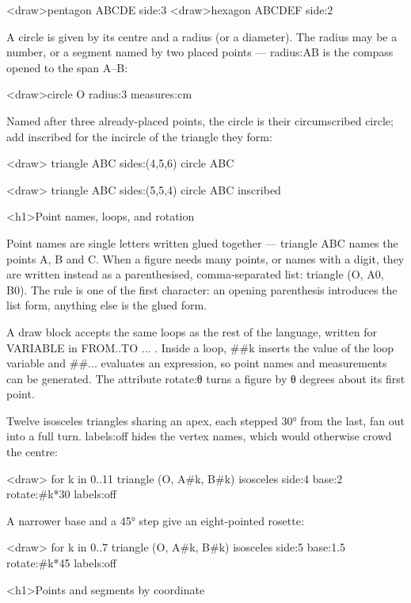\documentclass[
  margins=8,
  font=Latin Modern Roman,
  size=12,
  linespread=1.4,
  lang=en
]{scholatex}
\begin{document}
<draw>pentagon ABCDE side:3
<draw>hexagon ABCDEF side:2

A circle is given by its centre and a radius (or a diameter). The radius may
be a number, or a segment named by two placed points — radius:AB is the
compass opened to the span A–B:

<draw>circle O radius:3 measures:cm

Named after three already-placed points, the circle is their circumscribed
circle; add inscribed for the incircle of the triangle they form:

<draw>{
	triangle ABC sides:(4,5,6)
	circle ABC
}

<draw>{
	triangle ABC sides:(5,5,4)
	circle ABC inscribed
}

<h1>Point names, loops, and rotation

Point names are single letters written glued together — triangle ABC names
the points A, B and C. When a figure needs many points, or names with a
digit, they are written instead as a parenthesised, comma-separated list:
triangle (O, A0, B0). The rule is one of the first character: an opening
parenthesis introduces the list form, anything else is the glued form.

A draw block accepts the same loops as the rest of the language, written
for VARIABLE in FROM..TO { ... }. Inside a loop, ##k inserts the value of the
loop variable and ##{...} evaluates an expression, so point names and
measurements can be generated. The attribute rotate:θ turns a figure by θ
degrees about its first point.

Twelve isosceles triangles sharing an apex, each stepped 30° from the last,
fan out into a full turn. labels:off hides the vertex names, which would
otherwise crowd the centre:

<draw>{
	for k in 0..11 {
		triangle (O, A#k, B#k) isosceles side:4 base:2 rotate:#{k*30} labels:off
	}
}

A narrower base and a 45° step give an eight-pointed rosette:

<draw>{
	for k in 0..7 {
		triangle (O, A#k, B#k) isosceles side:5 base:1.5 rotate:#{k*45} labels:off
	}
}

<h1>Points and segments by coordinate
\end{document}
